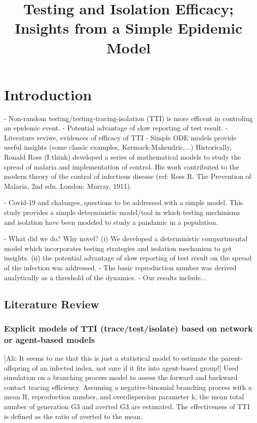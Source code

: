 \documentclass{article}
\title{Testing and Isolation Efficacy; Insights from a Simple Epidemic Model }
\theoremstyle{definition} %
\begin{document}
\maketitle

\section{Introduction}

- Non-random testing/testing-tracing-isolation (TTI) is more efficent in controling an epidemic event.
- Potential advantage of slow reporting of test result. 
- Literature reviwe, evidences of efficacy of TTI
- Simple ODE models provide useful insights (some classic examples, Kermack-Makendric,...)
Historically, Ronald Ross (I think) developed a series of mathematical models to study the spread of malaria and implementation of control. His work contributed to the modern theory of the control of
infectious disease (ref: Ross R. The Prevention of Malaria, 2nd edn. London: Murray, 1911).

- Covid-19 and chalanges, questions to be addressed with a simple model.
This study provides a simple deterministic model/tool in which testing mechinisms and isolation have been modeled to study a pandamic in a population. 

- What did we do? Why novel? 
(i) We developed a deterministic compartmental model which incorporates testing strategies and isolation mechanism to get insights.
(ii) the potential advantage of slow reporting of test result on the spread of the infection was addressed.
- The basic reproduction number was derived analytically as a threshold of the dynamics. 
- Our results include...

\subsection{Literature Review}

\subsubsection{Explicit models of TTI (trace/test/isolate) based on network or agent-based models}
\citep{endo2020implication} [Ali: It seems to me that this is just a statistical model to estimate the parent-offspring of an infected index, not sure if it fits into agent-based group!] Used simulation on a branching process model to assess the forward and backward contact tracing efficiency. Assuming a negative-binomial branching process with a mean R, reproduction number, and overdispersion parameter k, the mean total number of generation G3 and averted G3 are estimated. The effectiveness of TTI is defined as the ratio of averted to the mean.
\end{document}
